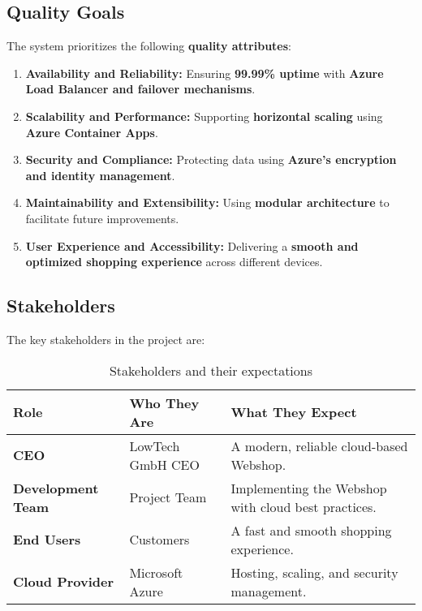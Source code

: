 \subsection{Quality Goals}
The system prioritizes the following \textbf{quality attributes}:

\begin{enumerate}
    \item \textbf{Availability and Reliability:} Ensuring \textbf{99.99\% uptime} with \textbf{Azure Load Balancer and failover mechanisms}.
    \item \textbf{Scalability and Performance:} Supporting \textbf{horizontal scaling} using \textbf{Azure Container Apps}.
    \item \textbf{Security and Compliance:} Protecting data using \textbf{Azure’s encryption and identity management}.
    \item \textbf{Maintainability and Extensibility:} Using \textbf{modular architecture} to facilitate future improvements.
    \item \textbf{User Experience and Accessibility:} Delivering a \textbf{smooth and optimized shopping experience} across different devices.
\end{enumerate}

\subsection{Stakeholders}
The key stakeholders in the project are:

\begin{table}[h]
\centering
\begin{tabular}{|l|l|l|}
\hline
\textbf{Role} & \textbf{Who They Are} & \textbf{What They Expect} \\ \hline
\textbf{CEO} & LowTech GmbH CEO & A modern, reliable cloud-based Webshop. \\ \hline
\textbf{Development Team} & Project Team & Implementing the Webshop with cloud best practices. \\ \hline
\textbf{End Users} & Customers & A fast and smooth shopping experience. \\ \hline
\textbf{Cloud Provider} & Microsoft Azure & Hosting, scaling, and security management. \\ \hline
\end{tabular}
\caption{Stakeholders and their expectations}
\label{tab:stakeholders}
\end{table}
